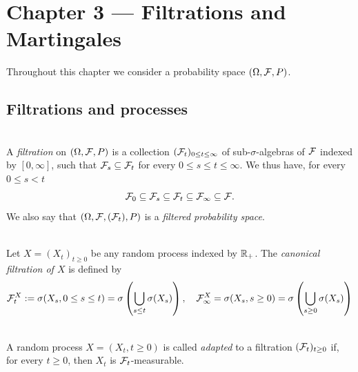 \section{Chapter 3 --- Filtrations and Martingales}
Throughout this chapter we consider a probability space $(\Omega, \mathcal{F}, P)$.
\subsection{Filtrations and processes}
\begin{definition}\label{chap3.1:definition-filtration}
 \\
A \textit{filtration} on $(\Omega, \mathcal{F}, P)$ is a collection $(\mathcal{F}_t)_{0 \leq t \leq \infty}$ of sub-$\sigma$-algebras of $\mathcal{F}$ indexed by $[0,\infty]$, such that $\mathcal{F}_s \subseteq \mathcal{F}_t$ for every $0 \leq s \leq t \leq \infty$. We thus have, for every $0 \leq s < t$ $$\mathcal{F}_0 \subseteq \mathcal{F}_s \subseteq \mathcal{F}_t \subseteq \mathcal{F}_\infty \subseteq \mathcal{F}.$$
We also say that $(\Omega, \mathcal{F}, (\mathcal{F}_t), P)$ is a \textit{filtered probability space}.
\end{definition}

\begin{definition}\label{chap3.1:definition-canonical_filtration}
 \\
Let $X = (X_t)_{t \geq 0}$ be any random process indexed by $\mathbb{R}_+$. The \textit{canonical filtration of $X$}  is defined by
$$\mathcal{F}_t^X:=\sigma(X_s, 0 \leq s \leq t)=\sigma\left(\bigcup_{s \leq t}\sigma(X_s)\right), \quad \mathcal{F}_\infty^X=\sigma(X_s, s \geq 0)=\sigma\left(\bigcup_{s \geq 0}\sigma(X_s)\right)$$
\end{definition}

\begin{definition}[Adaptedness]\label{chap3.1:definition-adaptedness}
 \\
A random process $X=(X_t, t \geq 0)$ is called \textit{adapted} to a filtration $(\mathcal{F}_t)_{t \geq 0}$ if, for every $t \geq 0$, then $X_t$ is $\mathcal{F}_t$-measurable.
\end{definition}

